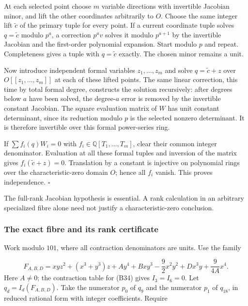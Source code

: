 \documentclass[
]{article}
\begin{document}
At each selected point choose \(m\) variable directions with invertible
Jacobian minor, and lift the other coordinates arbitrarily to \(O\).
Choose the same integer lift \(\widetilde c\) of the primary tuple for
every point. If a current coordinate tuple solves \(q=\widetilde c\)
modulo \(p^a\), a correction \(p^a v\) solves it modulo \(p^{a+1}\) by
the invertible Jacobian and the first-order polynomial expansion. Start
modulo \(p\) and repeat. Completeness gives a tuple with
\(q=\widetilde c\) exactly. The chosen minor remains a unit.

Now introduce independent formal variables \(z_1,\ldots,z_m\) and solve
\(q=\widetilde c+z\) over \(O [[z_1,\ldots,z_m]]\) at each of these
lifted points. The same linear correction, this time by total formal
degree, constructs the solution recursively: after degrees below \(a\)
have been solved, the degree-\(a\) error is removed by the invertible
constant Jacobian. The square evaluation matrix of \(W\) has unit
constant determinant, since its reduction modulo \(p\) is the selected
nonzero determinant. It is therefore invertible over this formal
power-series ring.

If \(\sum f_i(q)W_i=0\) with \(f_i\in\mathbb Q [T_1,\ldots,T_m]\), clear
their common integer denominator. Evaluation at all these formal tuples
and inversion of the matrix gives \(f_i(\widetilde c+z)=0\). Translation
by a constant is injective on polynomial rings over the
characteristic-zero domain \(O\); hence all \(f_i\) vanish. This proves
independence. \(\square\)

The full-rank Jacobian hypothesis is essential. A rank calculation in an
arbitrary specialized fibre alone need not justify a characteristic-zero
conclusion.

\subsubsection{The exact fibre and its rank
certificate}\label{the-exact-fibre-and-its-rank-certificate}

Work modulo \(101\), where all contraction denominators are units. Use
the family \protect{}\label{equation-B55}{}

\[
F_{A,B,D}=xyz^2+(x^3+y^3)z+Ay^4+Bxy^3-\frac92x^2y^2+Dx^3y+\frac9{4A}x^4.
\tag{B55}
\] Here \(A\ne0\); the contraction table for (B34) gives \(I_3=I_6=0\).
Let \(q_d=I_d(F_{A,B,D})\). Take the numerator \(p_0\) of \(q_9\) and
the numerator \(p_1\) of \(q_{18}\), in reduced rational form with
integer coefficients. Require
\protect{}\label{equation-B56}{}
\end{document}
